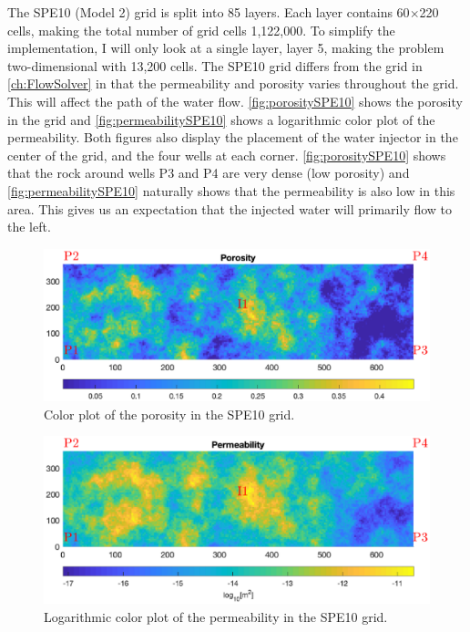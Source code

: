 The SPE10 (Model 2) grid is split into 85 layers. Each layer contains 60$\times$220 cells, making the total number of grid cells 1,122,000. To simplify the implementation, I will only look at a single layer, layer 5, making the problem two-dimensional with 13,200 cells. The SPE10 grid differs from the grid in \autoref{ch:FlowSolver} in that the permeability and porosity varies throughout the grid. This will affect the path of the water flow. \autoref{fig:porositySPE10} shows the porosity in the grid and \autoref{fig:permeabilitySPE10} shows a logarithmic color plot of the permeability. Both figures also display the placement of the water injector in the center of the grid, and the four wells at each corner. \autoref{fig:porositySPE10} shows that the rock around wells P3 and P4 are very dense (low porosity) and \autoref{fig:permeabilitySPE10} naturally shows that the permeability is also low in this area. This gives us an expectation that the injected water will primarily flow to the left.
\begin{figure}[H]
    \centering
    \includegraphics[width = \textwidth,clip=true,trim=20 130 10 90]{figures/porositySPE10.eps}
    \caption{Color plot of the porosity in the SPE10 grid.}
    \label{fig:porositySPE10}
\end{figure}
\begin{figure}[H]
    \centering
    \includegraphics[width = \textwidth,clip=true,trim=20 120 10 90]{figures/permeabilitySPE10.eps}
    \caption{Logarithmic color plot of the permeability in the SPE10 grid.}
    \label{fig:permeabilitySPE10}
\end{figure}

